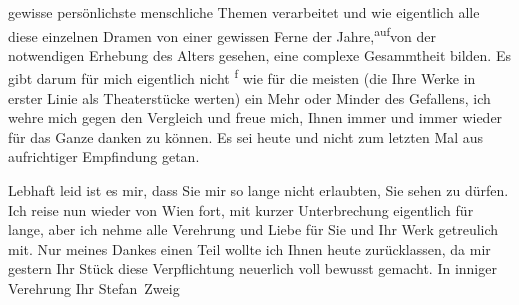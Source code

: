                    gewisse persönlichste menschliche Themen
               verarbeitet und wie eigentlich alle diese einzelnen Dramen von einer gewissen Ferne
               der Jahre,\substVorne{}\textsuperscript{auf}\substDazwischen{}von\substHinten{} der notwendigen Erhebung des Alters gesehen, eine complexe Gesammtheit
               bilden. Es gibt darum für mich eigentlich nicht \substVorne{}\textsuperscript{f }\substDazwischen{}w\substHinten{}ie für die meisten (die Ihre Werke in erster Linie als Theaterstücke werten)
               ein Mehr oder Minder des Gefallens, ich wehre mich gegen den Vergleich und freue
               mich, Ihnen immer und immer wieder für das Ganze danken zu können. Es sei
                  heute und nicht zum letzten Mal aus aufrichtiger Empfindung
               getan.\pend
           
\pstart
           Lebhaft leid ist es mir, dass Sie mir so lange nicht erlaubten, Sie sehen zu dürfen.
               Ich reise nun {\pb}wieder von Wien fort, mit kurzer Unterbrechung eigentlich für
               lange, aber ich nehme alle Verehrung und Liebe für Sie und Ihr Werk getreulich mit.
               Nur meines Dankes einen Teil wollte ich Ihnen heute zurücklassen, da mir
                  gestern Ihr Stück diese Verpflichtung neuerlich voll bewusst gemacht.\pend
           \pstart In inniger Verehrung Ihr \spacefill\mbox{Stefan Zweig}\pend{}\endnumbering{}
\begin{anhang}
\end{anhang}
      